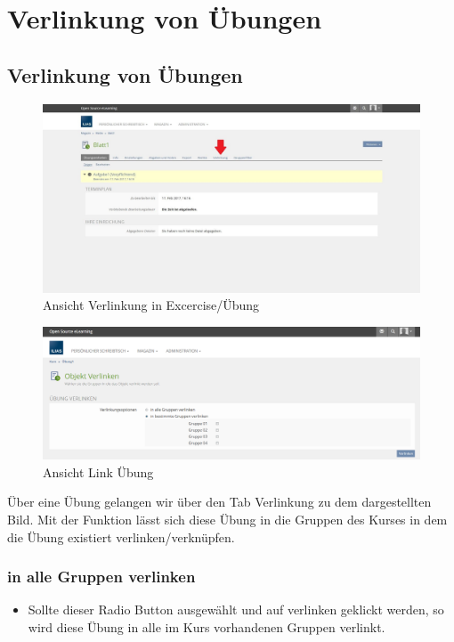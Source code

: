 \chapter{Verlinkung von Übungen}\label{linkUebung}
\minitoc
\clearpage

\section{Verlinkung von Übungen}
\begin{figure}
	\centering
	\includegraphics[width=1\textwidth]{img/excercise.jpg}
	\caption{Ansicht Verlinkung in Excercise/Übung}
\end{figure}

\begin{figure}
	\centering
	\includegraphics[width=1\textwidth]{img/linkUebung.png}
	\caption{Ansicht Link Übung}
\end{figure}

Über eine Übung gelangen wir über den Tab Verlinkung zu dem dargestellten Bild. 
Mit der Funktion lässt sich diese Übung in die Gruppen des Kurses in dem die Übung existiert verlinken/verknüpfen. 

\subsection*{in alle Gruppen verlinken}
\begin{itemize}
	\item Sollte dieser Radio Button ausgewählt und auf verlinken geklickt werden, so wird diese Übung in alle im Kurs vorhandenen Gruppen verlinkt. 
\end{itemize}


